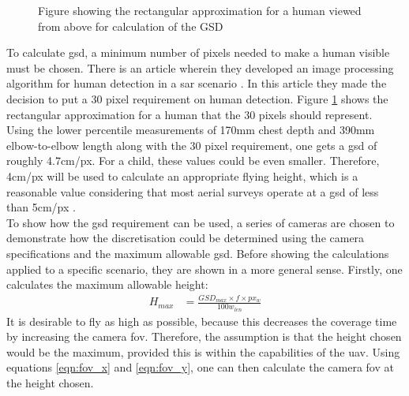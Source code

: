 \begin{figure}
	\caption{Figure showing the rectangular approximation for a human viewed from above for calculation of the GSD}
	\label{fig:GSD}
\end{figure}
To calculate \acs{gsd}, a minimum number of pixels needed to make a human visible must be chosen. There is an article wherein they developed an image processing algorithm for human detection in a \acl{sar} scenario \cite{Rudol2008}. In this article they made the decision to put a 30 pixel requirement on human detection.
Figure \ref{fig:GSD} shows the rectangular approximation for a human that the 30 pixels should represent.\\
Using the lower percentile measurements of 170mm chest depth and 390mm elbow-to-elbow length along with the 30 pixel requirement, one gets a \acs{gsd} of roughly 4.7cm/px. For a child, these values could be even smaller. Therefore, 4cm/px will be used to calculate an appropriate flying height, which is a reasonable value considering that most aerial surveys operate at a \acs{gsd} of less than 5cm/px \cite{PropellerAero2021}.\\
To show how the \acs{gsd} requirement can be used, a series of cameras are chosen to demonstrate how the discretisation could be determined using the camera specifications and the maximum allowable \acs{gsd}. Before showing the calculations applied to a specific scenario, they are shown in a more general sense. Firstly, one calculates the maximum allowable height:
\begin{equation}
	\label{eqn:height_calculation}
	\begin{aligned}
		H_{max} &= \frac{GSD_{max} \times f \times px_w}{100w_{len}}
	\end{aligned}
\end{equation}
It is desirable to fly as high as possible, because this decreases the coverage time by increasing the camera \acl{fov}. Therefore, the assumption is that the height chosen would be the maximum, provided this is within the capabilities of the \acs{uav}. Using equations \ref{eqn:fov_x} and \ref{eqn:fov_y}, one can then calculate the camera \acs{fov} at the height chosen.\\
